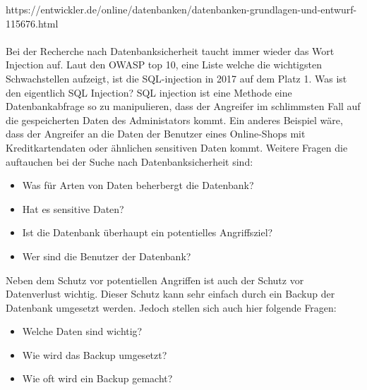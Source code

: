 https://entwickler.de/online/datenbanken/datenbanken-grundlagen-und-entwurf-115676.html
\\
\\

Bei der Recherche nach Datenbanksicherheit taucht immer wieder das Wort Injection auf. Laut den OWASP top 10, eine Liste welche die wichtigsten Schwachstellen aufzeigt, ist die SQL-injection in 2017 auf dem Platz 1. Was ist den eigentlich SQL Injection? SQL injection ist eine Methode eine Datenbankabfrage so zu manipulieren, dass der Angreifer im schlimmsten Fall auf die gespeicherten Daten des Administators kommt. Ein anderes Beispiel wäre, dass der Angreifer an die Daten der Benutzer eines Online-Shops mit Kreditkartendaten oder ähnlichen sensitiven Daten kommt.
Weitere Fragen die auftauchen bei der Suche nach Datenbanksicherheit sind:
\begin{itemize}
\item Was für Arten von Daten beherbergt die Datenbank?
\item Hat es sensitive Daten?
\item Ist die Datenbank überhaupt ein potentielles Angriffsziel?
\item Wer sind die Benutzer der Datenbank?
\end{itemize}
Neben dem Schutz vor potentiellen Angriffen ist auch der Schutz vor Datenverlust wichtig. Dieser Schutz kann sehr einfach durch ein Backup der Datenbank umgesetzt werden. Jedoch stellen sich auch hier folgende Fragen:
\begin{itemize}
\item Welche Daten sind wichtig?
\item Wie wird das Backup umgesetzt?
\item Wie oft wird ein Backup gemacht?
\end{itemize}

